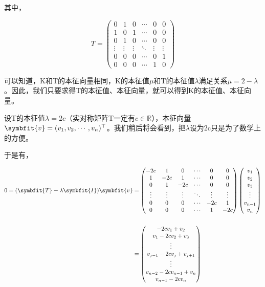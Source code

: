 \documentclass[10pt, a4paper]{article}
\newcommand\vbf{\symbfit}
\begin{document}
    其中，

    \[T=
    \begin{pmatrix}
        0&1&0&\cdots&0&0\\
        1&0&1&\cdots&0&0\\
        0&1&0&\cdots&0&0\\
        \vdots&\vdots&\vdots&\ddots &\vdots&\vdots\\
        0&0&0&\cdots&0&1\\
        0&0&0&\cdots&1&0
    \end{pmatrix}\]

    可以知道，K和T的本征向量相同，K的本征值$\mu$和T的本征值$\lambda$满足关系$\mu=2-\lambda$。因此，我们只要求得T的本征值、本征向量，就可以得到K的本征值、本征向量。

    设T的本征值$\lambda=2c$（实对称矩阵T一定有$c\in \mathbb{R}$），本征向量$\vbf{v}=(v_1,v_2,\cdots,v_n)^\top$。我们稍后将会看到，把$\lambda$设为2c只是为了数学上的方便。

    于是有，

    \begin{align*}
        0=(\vbf{T}-\lambda\vbf{I})\vbf{v}&=
        \begin{pmatrix}
            -2c&1&0&\cdots&0&0\\
            1&-2c&1&\cdots&0&0\\
            0&1&-2c&\cdots&0&0\\
            \vdots&\vdots&\vdots&\ddots &\vdots&\vdots\\
            0&0&0&\cdots&-2c&1\\
            0&0&0&\cdots&1&-2c
        \end{pmatrix}
        \begin{pmatrix}
            v_1\\
            v_2\\
            v_3\\
            \vdots\\
            v_{n-1}\\
            v_n
        \end{pmatrix}\\
        &\\
        &=
        \begin{pmatrix}
            -2cv_1+v_2\\
            v_1-2cv_2+v_3\\
            \vdots\\
            v_{j-1}-2cv_j+v_{j+1}\\
            \vdots\\
            v_{n-2}-2cv_{n-1}+v_n\\
            v_{n-1}-2cv_n
        \end{pmatrix}
    \end{align*}
\end{document}
